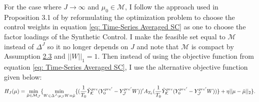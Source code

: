 \documentclass{article}
\begin{document}
\par
For the case where $J \rightarrow \infty$ and $\mu_0 \in \mathcal{M}$, I follow the approach used in Proposition 3.1 of \cite{LargeSampleProperties} by reformulating the optimization problem to choose the control weights in equation \eqref{eq: Time-Series Averaged SC} as one to choose the factor loadings of the Synthetic Control. I make the feasible set equal to $\mathcal{M}$ instead of $\Delta^J$ so it no longer depends on $J$ and note that $\mathcal{M}$ is compact by Assumption \hyperref[A2]{2.3} and $||W||_1 = 1$. Then instead of using the objective function from equation \eqref{eq: Time-Series Averaged SC}, I use the alternative objective function given below: 
\begin{equation*}
    H_J(\mu) =  \min_{\Tilde{\mu} \in \mathcal{M}_{\mathcal{J}}} \{ \min_{W \in \Delta^J: \mu_{\mathcal{J}} W = \Tilde{\mu}} \{  (\frac{1}{T_0} \Tilde{Y}_{\mathcal{K}}^{pre}(Y_{0}^{pre'} - Y_{\mathcal{J}}^{pre'}W))'A_{T_0}(\frac{1}{T_0} \Tilde{Y}_{\mathcal{K}}^{pre}(Y_{0}^{pre'} - Y_{\mathcal{J}}^{pre'}W))  \} + \eta ||\mu - \Tilde{\mu}||_2 \}.
\end{equation*}
\end{document}
